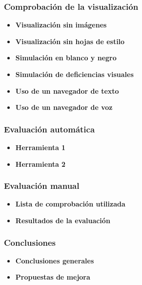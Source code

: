 \documentclass[a4paper,11pt]{article}
\begin{document}
\subsubsection{Comprobación de la visualización}
\begin{itemize}
  \item \textbf{Visualización sin imágenes}
  \item \textbf{Visualización sin hojas de estilo}
  \item \textbf{Simulación en blanco y negro}
  \item \textbf{Simulación de deficiencias visuales}
  \item \textbf{Uso de un navegador de texto}
  \item \textbf{Uso de un navegador de voz}
\end{itemize}

\subsubsection{Evaluación automática}
\begin{itemize}
  \item \textbf{Herramienta 1}
  \item \textbf{Herramienta 2}
\end{itemize}

\subsubsection{Evaluación manual}
\begin{itemize}
  \item \textbf{Lista de comprobación utilizada}
  \item \textbf{Resultados de la evaluación}

\end{itemize}

\subsubsection{Conclusiones}
\begin{itemize}
  \item \textbf{Conclusiones generales}
  \item \textbf{Propuestas de mejora}
\end{itemize}
\end{document}
